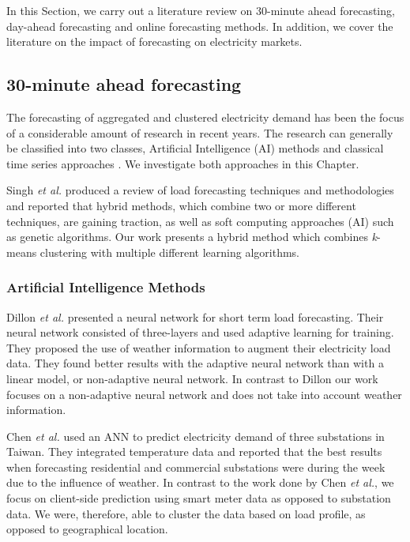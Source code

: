 In this Section, we carry out a literature review on 30-minute ahead forecasting, day-ahead forecasting and online forecasting methods. In addition, we cover the literature on the impact of forecasting on electricity markets. 

\subsection{30-minute ahead forecasting}

The forecasting of aggregated and clustered electricity demand has been the focus of a considerable amount of research in recent years. The research can generally be classified into two classes, Artificial Intelligence (AI) methods \cite{Kim2000, Tiong2008,Quilumba2014} and classical time series approaches \cite{Huang2003,Nguyen2017}. We investigate both approaches in this Chapter.

Singh \textit{et al.} \cite{Singh2012} produced a review of load forecasting techniques and methodologies and reported that hybrid methods, which combine two or more different techniques, are gaining traction, as well as soft computing approaches (AI) such as genetic algorithms. Our work presents a hybrid method which combines \textit{k}-means clustering with multiple different learning algorithms.

\subsubsection{Artificial Intelligence Methods}

Dillon \textit{et al.} \cite{Dillon1991} presented a neural network for short term load forecasting. Their neural network consisted of three-layers and used adaptive learning for training. They proposed the use of weather information to augment their electricity load data. They found better results with the adaptive neural network than with a linear model, or non-adaptive neural network. In contrast to Dillon our work focuses on a non-adaptive neural network and does not take into account weather information.

Chen \textit{et al.}  \cite{Chen1996} used an \Gls{ANN} to predict electricity demand of three substations in Taiwan. They integrated temperature data and reported that the best results when forecasting residential and commercial substations were during the week due to the influence of weather. In contrast to the work done by Chen \textit{et al.}, we focus on client-side prediction using smart meter data as opposed to substation data. We were, therefore, able to cluster the data based on load profile, as opposed to geographical location.


